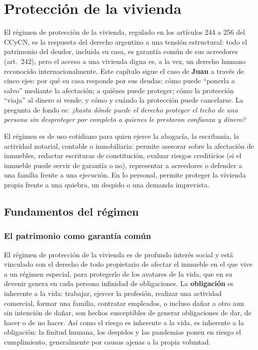 \documentclass[12pt,oneside]{book}
\begin{document}
\chapter{Protección de la vivienda}\label{cap:vivienda}

El régimen de protección de la vivienda, regulado en los artículos 244 a 256 del CCyCN, es la respuesta del derecho argentino a una tensión estructural: todo el patrimonio del deudor, incluida su casa, es garantía común de sus acreedores (art.~242), pero el acceso a una vivienda digna es, a la vez, un derecho humano reconocido internacionalmente. Este capítulo sigue el caso de \textbf{Juan} a través de cinco ejes: por qué su casa responde por sus deudas; cómo puede ``ponerla a salvo'' mediante la afectación; a quiénes puede proteger; cómo la protección ``viaja'' al dinero si vende; y cómo y cuándo la protección puede cancelarse. La pregunta de fondo es: \textit{¿hasta dónde puede el derecho proteger el techo de una persona sin desproteger por completo a quienes le prestaron confianza y dinero?}

El régimen es de uso cotidiano para quien ejerce la abogacía, la escribanía, la actividad notarial, contable o inmobiliaria: permite asesorar sobre la afectación de inmuebles, redactar escrituras de constitución, evaluar riesgos crediticios (si el inmueble puede servir de garantía o no), representar a acreedores o defender a una familia frente a una ejecución. En lo personal, permite proteger la vivienda propia frente a una quiebra, un despido o una demanda imprevista.

\section{Fundamentos del régimen}

\subsection{El patrimonio como garantía común}

El régimen de protección de la vivienda es de profundo interés social y está vinculado con el derecho de todo propietario de afectar el inmueble en el que vive a un régimen especial, para protegerlo de los avatares de la vida, que en su devenir genera en cada persona infinidad de obligaciones. La \textbf{obligación} es inherente a la vida: trabajar, ejercer la profesión, realizar una actividad comercial, formar una familia, contratar empleados, o incluso dañar a otro aun sin intención de dañar, son hechos susceptibles de generar obligaciones de dar, de hacer o de no hacer. Así como el riesgo es inherente a la vida, es inherente a la obligación: la finitud humana, los despidos y las pandemias ponen en riesgo el cumplimiento, generalmente por causas ajenas a la propia voluntad.
\end{document}
